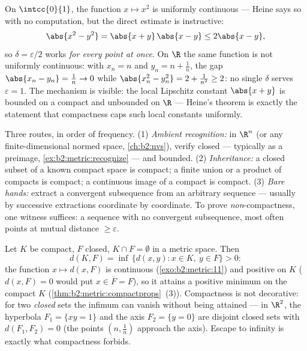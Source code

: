 \begin{example}\label{ex:b2:metric:heinework}
On $\intcc{0}{1}$, the function $x \mapsto x^2$ is uniformly
continuous --- Heine says so with no computation, but the direct
estimate is instructive:
\[
\abs{x^2 - y^2} = \abs{x + y}\,\abs{x - y} \leq 2\abs{x - y},
\]
so $\delta = \varepsilon/2$ works \emph{for every point at
once}. On $\R$ the same function is not uniformly continuous:
with $x_n = n$ and $y_n = n + \frac1n$, the gap $\abs{x_n - y_n}
= \frac1n \to 0$ while $\abs{x_n^2 - y_n^2} = 2 + \frac1{n^2}
\geq 2$: no single $\delta$ serves $\varepsilon = 1$. The
mechanism is visible: the local Lipschitz constant $\abs{x + y}$
is bounded on a compact and unbounded on $\R$ --- Heine's
theorem is exactly the statement that compactness caps such
local constants uniformly.
\end{example}

\begin{method}\label{met:b2:metric:compactness}
Three routes, in order of frequency. (1) \emph{Ambient
recognition:} in $\R^n$ (or any finite-dimensional normed
space, \cref{ch:b2:nvs}), verify closed --- typically as a
preimage, \cref{ex:b2:metric:recognize} --- and bounded. (2)
\emph{Inheritance:} a closed subset of a known compact space is
compact; a finite union or a product of compacts is compact; a
continuous image of a compact is compact. (3) \emph{Bare
hands:} extract a convergent subsequence from an arbitrary
sequence --- usually by successive extractions coordinate by
coordinate. To prove \emph{non}-compactness, one witness
suffices: a sequence with no convergent subsequence, most often
points at mutual distance $\geq \varepsilon$.
\end{method}

\begin{example}\label{ex:b2:metric:setdistance}
Let $K$ be compact, $F$ closed, $K \cap F = \emptyset$ in a
metric space. Then
\[
d(K, F) = \inf\,\{d(x, y) : x \in K,\ y \in F\} > 0 :
\]
the function $x \mapsto d(x, F)$ is continuous
(\cref{exo:b2:metric:11}) and positive on $K$ ($d(x, F) = 0$
would put $x \in \overline F = F$), so it attains a positive
minimum on the compact $K$
(\cref{thm:b2:metric:compactprops}~(3)). Compactness is not
decorative: for two \emph{closed} sets the infimum can vanish
without being attained --- in $\R^2$, the hyperbola $F_1 = \{xy
= 1\}$ and the axis $F_2 = \{y = 0\}$ are disjoint closed sets
with $d(F_1, F_2) = 0$ (the points $(n, \frac1n)$ approach the
axis). Escape to infinity is exactly what compactness forbids.
\end{example}

